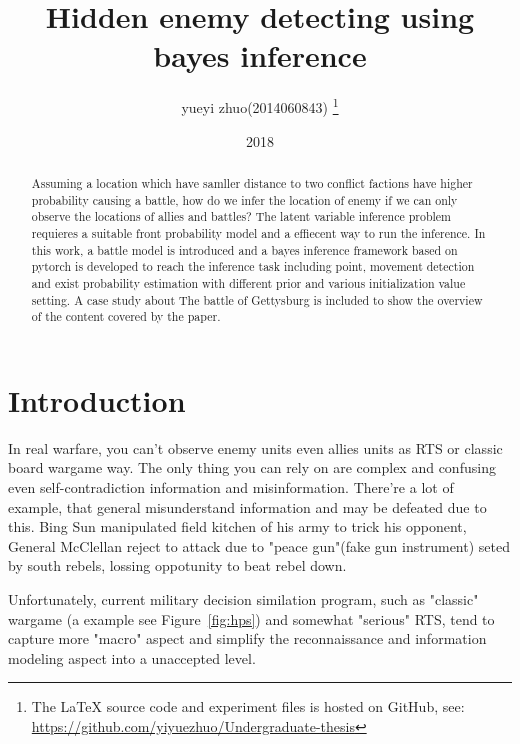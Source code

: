 \documentclass{article}
\title{Hidden enemy detecting using bayes inference}
\author{yueyi zhuo(2014060843) 
\footnote{The LaTeX source code and experiment files is hosted on GitHub, see: 
\url{https://github.com/yiyuezhuo/Undergraduate-thesis}}}
\date{2018}
\begin{document}
\maketitle

\begin{abstract}

Assuming a location which have samller distance to two conflict factions have higher probability causing a battle,
how do we infer the location of enemy if we can only observe the locations of allies and battles? 
The latent variable inference problem requieres a suitable front probability model and a effiecent way to run the 
inference. In this work, a battle model is introduced and a bayes inference framework based on pytorch 
is developed to reach the inference task including point, movement detection and 
exist probability estimation with different prior and various initialization value setting.
A case study about The battle of Gettysburg is included to show the overview of the content covered by the paper.

\end{abstract}

\tableofcontents



\section{Introduction}

In real warfare, you can't observe enemy units even allies units as RTS or classic board wargame way.
The only thing you can rely on are complex and confusing even self-contradiction information and misinformation.
There're a lot of example, that general misunderstand information and may be defeated due to this. 
Bing Sun manipulated field kitchen of his army to trick his opponent, General McClellan reject to attack
due to "peace gun"(fake gun instrument) seted by south rebels, lossing oppotunity to beat rebel down.

Unfortunately, current military decision similation program, 
such as "classic" wargame (a example see Figure~\ref{fig:hps}) and somewhat  "serious" RTS, 
tend to capture more "macro" aspect and simplify the reconnaissance and 
information modeling aspect into a unaccepted level.
\end{document}
